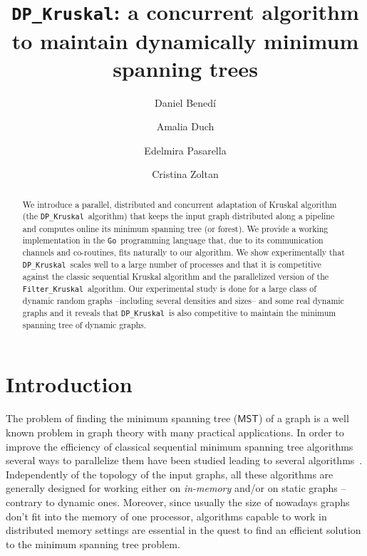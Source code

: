 \documentclass[runningheads,UKenglish]{llncs}
\newcommand{\mst}{$\mathsf{MST}$}
\newcommand{\DPmst}{\texttt{DP\_{Kruskal}}}
\newcommand{\FKruskal}{\texttt{Filter\_{Kruskal}}}
\newcommand{\Go}{{\tt Go}}
\begin{document}
%
\title{\DPmst: a concurrent algorithm to maintain dynamically minimum spanning trees}
%
\titlerunning{\DPmst}
%

\author{Daniel Benedí \and Amalia Duch \and
Edelmira Pasarella \and Cristina Zoltan
}
%
%
%
\maketitle              %
%
\begin{abstract}
We introduce a parallel, distributed and concurrent adaptation of Kruskal algorithm (the \DPmst\ algorithm) that keeps the input graph distributed 
along a pipeline and computes online its minimum spanning tree (or forest).
We provide a working implementation in the \Go\ programming language that, due to its communication channels and co-routines, fits naturally to our algorithm.
We show experimentally that \DPmst\ scales well to a large number of processes 
and that it is competitive against the classic sequential Kruskal algorithm 
and the parallelized version of the \FKruskal\ algorithm.
Our experimental study is done for a large class of dynamic random graphs --including several densities and sizes-- and some real dynamic graphs and 
it reveals that \DPmst\ is also competitive to maintain the minimum spanning tree of dynamic graphs.
\end{abstract}
%
\section{Introduction}
\label{sec:intro}

The problem of finding the minimum spanning tree (\mst) of a graph is a well known problem in graph theory with many practical applications. 
In order to improve the efficiency of classical sequential minimum spanning tree algorithms several ways to parallelize them have been studied leading 
to several  algorithms~\cite{bader2006fast,durbhakula2020parallel,tripathy2013new}.
Independently of the topology of the input graphs, all these algorithms 
are generally designed for working either on \textit{in-memory} and/or on static graphs --contrary to dynamic ones. 
Moreover, since usually the size of nowadays graphs don't fit 
into the memory of one processor, algorithms capable 
to work in distributed memory settings are essential in the quest 
to find an efficient solution to the minimum spanning tree problem. 
\end{document}
